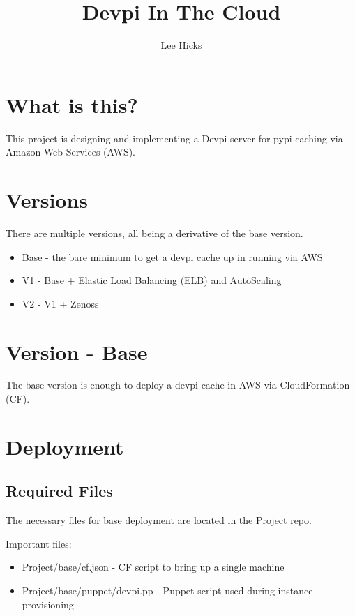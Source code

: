 \documentclass[12pt, letterpaper]{article}
\begin{document}
\title{Devpi In The Cloud}
\author{Lee Hicks}

\maketitle

\section{What is this?}
This project is designing and implementing a Devpi server for pypi caching via Amazon Web Services (AWS).

\section{Versions}
There are multiple versions, all being a derivative of the base version.

\begin{itemize}
    \item Base - the bare minimum to get a devpi cache up in running via AWS 
    \item V1 - Base + Elastic Load Balancing (ELB) and AutoScaling
    \item V2 - V1 + Zenoss 
\end{itemize}

\section{Version - Base}
The base version is enough to deploy a devpi cache in AWS via CloudFormation (CF).

\section{Deployment}

\subsection{Required Files}
The necessary files for base deployment are located in the Project repo.

Important files:
\begin{itemize}
    \item Project/base/cf.json - CF script to bring up a single machine
    \item Project/base/puppet/devpi.pp - Puppet script used during instance provisioning
\end{itemize}
\end{document}
